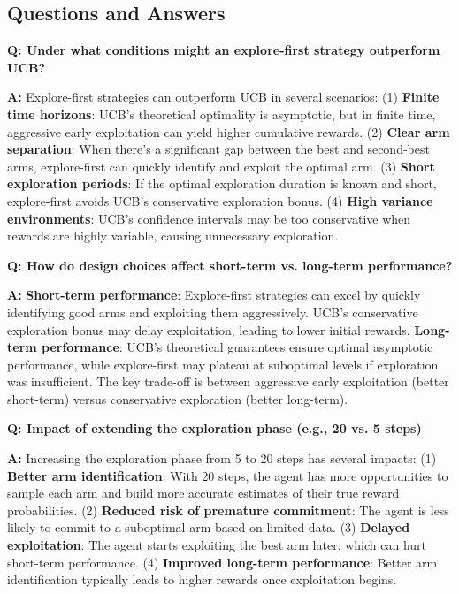 \documentclass[12pt]{article}
\begin{document}
{{{\subsection{Questions and Answers}

\textbf{Q: Under what conditions might an explore-first strategy outperform UCB?}

\textbf{A:} Explore-first strategies can outperform UCB in several scenarios: (1) \textbf{Finite time horizons}: UCB's theoretical optimality is asymptotic, but in finite time, aggressive early exploitation can yield higher cumulative rewards. (2) \textbf{Clear arm separation}: When there's a significant gap between the best and second-best arms, explore-first can quickly identify and exploit the optimal arm. (3) \textbf{Short exploration periods}: If the optimal exploration duration is known and short, explore-first avoids UCB's conservative exploration bonus. (4) \textbf{High variance environments}: UCB's confidence intervals may be too conservative when rewards are highly variable, causing unnecessary exploration.

\textbf{Q: How do design choices affect short-term vs. long-term performance?}

\textbf{A:} \textbf{Short-term performance}: Explore-first strategies can excel by quickly identifying good arms and exploiting them aggressively. UCB's conservative exploration bonus may delay exploitation, leading to lower initial rewards. \textbf{Long-term performance}: UCB's theoretical guarantees ensure optimal asymptotic performance, while explore-first may plateau at suboptimal levels if exploration was insufficient. The key trade-off is between aggressive early exploitation (better short-term) versus conservative exploration (better long-term).

\textbf{Q: Impact of extending the exploration phase (e.g., 20 vs. 5 steps)}

\textbf{A:} Increasing the exploration phase from 5 to 20 steps has several impacts: (1) \textbf{Better arm identification}: With 20 steps, the agent has more opportunities to sample each arm and build more accurate estimates of their true reward probabilities. (2) \textbf{Reduced risk of premature commitment}: The agent is less likely to commit to a suboptimal arm based on limited data. (3) \textbf{Delayed exploitation}: The agent starts exploiting the best arm later, which can hurt short-term performance. (4) \textbf{Improved long-term performance}: Better arm identification typically leads to higher rewards once exploitation begins.

}}}
\end{document}
